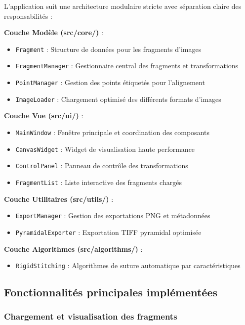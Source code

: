 \documentclass[12pt,a4paper]{report}
\begin{document}
L'application suit une architecture modulaire stricte avec séparation claire des responsabilités :

\textbf{Couche Modèle (src/core/)} :
\begin{itemize}
\item \texttt{Fragment} : Structure de données pour les fragments d'images
\item \texttt{FragmentManager} : Gestionnaire central des fragments et transformations
\item \texttt{PointManager} : Gestion des points étiquetés pour l'alignement
\item \texttt{ImageLoader} : Chargement optimisé des différents formats d'images
\end{itemize}

\textbf{Couche Vue (src/ui/)} :
\begin{itemize}
\item \texttt{MainWindow} : Fenêtre principale et coordination des composants
\item \texttt{CanvasWidget} : Widget de visualisation haute performance
\item \texttt{ControlPanel} : Panneau de contrôle des transformations
\item \texttt{FragmentList} : Liste interactive des fragments chargés
\end{itemize}

\textbf{Couche Utilitaires (src/utils/)} :
\begin{itemize}
\item \texttt{ExportManager} : Gestion des exportations PNG et métadonnées
\item \texttt{PyramidalExporter} : Exportation TIFF pyramidal optimisée
\end{itemize}

\textbf{Couche Algorithmes (src/algorithms/)} :
\begin{itemize}
\item \texttt{RigidStitching} : Algorithmes de suture automatique par caractéristiques
\end{itemize}

\subsection{Fonctionnalités principales implémentées}

\subsubsection{Chargement et visualisation des fragments}
\end{document}
